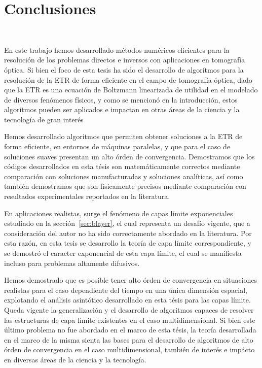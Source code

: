 \chapter{Conclusiones}
\lhead{\thepage}
 \\
\vspace{0.01\textheight}

En este trabajo hemos desarrollado métodos numéricos eficientes 
para la resolución de los problemas directos e inversos con 
aplicaciones en tomografía óptica. 
Si bien el foco de esta tesis ha sido el desarrollo de algorítmos 
para la resolución de la ETR de forma eficiente en el campo 
de tomografía óptica, 
dado que la ETR es una ecuación de Boltzmann 
linearizada de utilidad en el modelado de diversos 
fenómenos físicos, y como se mencionó en la introducción, estos algorítmos pueden ser aplicados e impactan 
en otras áreas de la ciencia y la tecnología de gran interés~\cite{Howell2010, Thynell1998,Duderstadt1979,Qin2015,Dymond1997,Chandrasekhar1960,Zhu2005,Zhu2010,Vassiliev2010,Bedford2019,Vassiliev2010,Bedford2019,Larsen2006, Sanchez1982, Anli2006,Mishchenko1999, Prasher2003}

 Hemos desarrollado algoritmos que permiten obtener soluciones 
 a la ETR de forma eficiente, en entornos de máquinas paralelas, 
 y que para el caso de soluciones suaves presentan un alto órden de convergencia. 
 Demostramos que los códigos desarrollados en esta tésis son matemáticamente 
 correctos mediante comparación con soluciones manufacturadas y soluciones 
 analíticas, así como también demostramos que son físicamente 
 precisos mediante comparación con resultados experimentales 
 reportados en la literatura.
 
 En aplicaciones realistas, surge el fenómeno de capas límite exponenciales 
 estudiado en la sección~\ref{sec:blayer}, el cual representa un desafío 
 vigente, que a consideración del autor no ha sido correctamente 
 abordado en la literatura. Por esta razón, en esta tesis 
 se desarrollo la teoría de capa límite correspondiente, y se demostró 
 el caracter exponencial de esta capa límite, el cual se manifiesta 
 incluso para problemas altamente difusivos.
 
 Hemos demostrado que es posible 
 tener alto órden de convergencia en situaciones realistas para 
 el caso dependiente del tiempo en una única dimensión espacial, 
 explotando el análisis asintótico desarrollado en esta tésis para las capas límite. 
 Queda vigente la generalización y el desarrollo de algoritmos capaces 
 de resolver las estructuras de capa límite existentes en el caso 
 multidimensional. Si bien este último problema no fue abordado en el marco de esta tésis, 
 la teoría desarrollada en el marco de la misma sienta las bases 
 para el desarrollo de algoritmos de alto órden de convergencia en el 
 caso multidimensional, también de interés e impácto en diversas 
 áreas de la ciencia y la tecnología. 
 
